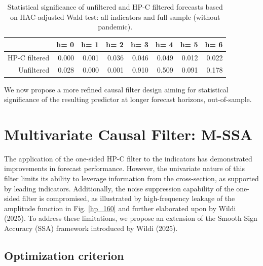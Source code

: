 \documentclass[a4paper]{article}
\begin{document}
\begin{table}[ht]
\centering
\begin{tabular}{rrrrrrrr}
  \hline
 & h= 0 & h= 1 & h= 2 & h= 3 & h= 4 & h= 5 & h= 6 \\ 
  \hline
HP-C filtered & 0.000 & 0.001 & 0.036 & 0.046 & 0.049 & 0.012 & 0.022 \\ 
  Unfiltered & 0.028 & 0.000 & 0.001 & 0.910 & 0.509 & 0.091 & 0.178 \\ 
   \hline
\end{tabular}
\caption{Statistical significance of unfiltered and HP-C filtered forecasts based on HAC-adjusted Wald test: all indicators and full sample (without pandemic).  } 
\label{f_stat}
\end{table}
We now propose a more refined causal filter design aiming for statistical significance of the resulting predictor at longer forecast horizons, out-of-sample.   




\section{Multivariate Causal Filter: M-SSA}

The application of the one-sided HP-C filter to the indicators has demonstrated improvements in forecast performance. However, the univariate nature of this filter limits its ability to leverage information from the cross-section, as supported by leading indicators. Additionally, the noise suppression capability of the one-sided filter is compromised, as illustrated by high-frequency leakage of the amplitude function in Fig. \eqref{hp_160} and further elaborated upon by Wildi (2025). To address these limitations, we propose an extension of the Smooth Sign Accuracy (SSA) framework introduced by Wildi (2025).


\subsection{Optimization criterion}
\end{document}
